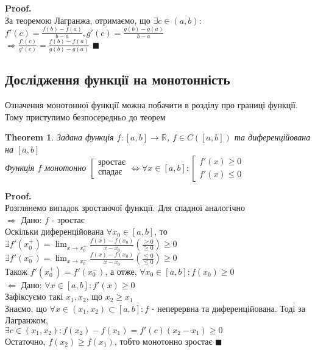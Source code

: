 \documentclass[a4paper, 14pt]{extarticle}
\def\huge{\displaystyle}
\def\bigline{\vspace{5mm}\\}
\def\rightproof{$\boxed{\Rightarrow}$ }
\def\leftproof{$\boxed{\Leftarrow}$ }
\theoremstyle{theoremdd}
\newtheorem{theorem}{Theorem}[subsection]
\theoremstyle{theoremdd}
\theoremstyle{theoremdd}
\theoremstyle{theoremdd}
\theoremstyle{theoremdd}
\theoremstyle{theoremdd}
\theoremstyle{theoremdd}
\theoremstyle{theoremdd}
\newenvironment{pf}{\vspace*{-3mm} \textbf{Proof. \\}}{$\blacksquare$}
\begin{document}
\begin{pf}
За теоремою Лагранжа, отримаємо, що $\exists c \in (a,b):$\\
$f'(c) = \huge \frac{f(b)-f(a)}{b-a}, g'(c) = \huge \frac{g(b)-g(a)}{b-a}$\\
$\Rightarrow \huge \frac{f'(c)}{g'(c)} = \frac{f(b)-f(a)}{g(b)-g(a)}$
\end{pf}

\subsection{Дослідження функції на монотонність}
Означення монотонної функції можна побачити в розділу про границі функції. Тому приступимо безпосередньо до теорем
\begin{theorem}
Задана функція $f: [a,b] \to \mathbb{R}$, $f \in C([a,b])$ та диференційована на $[a,b]$\\
Функція $f$ монотонно $\left[ \begin{gathered} \textrm{зростає} \\ \textrm{спадає} \end{gathered} \right. \iff \forall x \in [a,b]: \left[ \begin{gathered} f'(x) \geq 0 \\ f'(x) \leq 0 \end{gathered} \right.$
\end{theorem}
\begin{pf}
Розглянемо випадок зростаючої функції. Для спадної аналогічно\\
\rightproof Дано: $f$ - зростає\\
Оскільки диференційована $\forall x_0 \in [a,b]$, то \\ 
$\exists f'(x_0^+) = \huge \lim_{x \to x_0^+} \frac{f(x)-f(x_0)}{x-x_0} \left( \frac{\geq 0}{\geq 0} \right) \geq 0$\\
$\exists f'(x_0^-) = \huge \lim_{x \to x_0^-} \frac{f(x)-f(x_0)}{x-x_0} \left( \frac{\leq 0}{\leq 0} \right) \geq 0$\\
Також $f'(x_0^+) = f'(x_0^-)$, а отже, $\forall x_0 \in [a,b]: f(x_0) \geq 0$
\bigline
\leftproof Дано: $\forall x \in [a,b]: f'(x) \geq 0$\\
Зафіксуємо такі $x_1,x_2$, що $x_2 \geq x_1$\\
Знаємо, що $\forall x \in (x_1,x_2) \subset [a,b]: f$ - неперервна та диференційована. Тоді за Лагранжом,\\
$\exists c \in (x_1,x_2): f(x_2)-f(x_1) = f'(c)(x_2-x_1) \geq 0$\\
Остаточно, $f(x_2) \geq f(x_1)$, тобто монотонно зростає
\end{pf}
\end{document}
